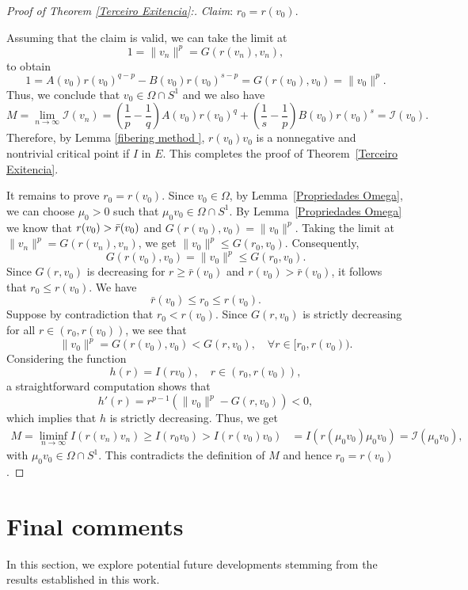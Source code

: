 \documentclass[12pt,reqno]{amsart}
\begin{document}
\begin{proof}[Proof of Theorem \ref{Terceiro Exitencia}:]
\noindent\textit{Claim}: $r_0=r(v_0)$.

Assuming that the claim is valid, we can take the limit at 
$$ 
 1=\|v_n\|^p=G(r(v_n),v_n),
 $$
 to obtain
\begin{equation*}
1=A(v_0)r(v_0)^{q-p}-B(v_0)r(v_0)^{s-p}=G(r(v_0),v_0)=\|v_0\|^p.
\end{equation*}
Thus, we conclude that $v_0\in \Omega\cap S^1$ and we also have 
$$
M=\lim_{n\rightarrow\infty} \mathcal{I}(v_n)=\left(\frac{1}{p}-\frac{1}{q}\right)A(v_0)r(v_0)^q+\left(\frac{1}{s}-\frac{1}{p}\right)B(v_0)r(v_0)^s=\mathcal{I}(v_0).
$$
Therefore, by Lemma \ref{fibering method }, $r(v_0)v_0$ is a nonnegative and nontrivial critical point if $I$ in $E$. This completes the proof of Theorem~\ref{Terceiro Exitencia}.

It remains to prove $r_0=r(v_0)$. Since $v_0 \in \Omega$, by Lemma~\ref{Propriedades Omega}, we can choose $\mu_0>0$ such that $\mu_0 v_0 \in \Omega\cap S^1$. By Lemma~\ref{Propriedades Omega} we know that $r( v_0)>\Bar{r}( v_0)$ and $G(r(v_0),v_0)=\|v_0\|^p$. Taking the limit at $\|v_n\|^p=G(r(v_n),v_n)$, we get 
$
\|v_0\|^p\leq G(r_0,v_0)$. Consequently,
$$
G(r(v_0),v_0)=\|v_0\|^p\leq G(r_0,v_0).
$$
Since $G(r,v_0)$ is decreasing for $r\geq \bar{r}(v_0)$ and $r(v_0)>\bar{r}(v_0)$, it follows that $r_0\leq r(v_0)$. We have 
$$
\bar{r}(v_0)\leq r_0\leq r(v_0).
$$
Suppose by contradiction that $r_0<r(v_0)$. Since $G(r,v_0)$ is strictly decreasing for all $r\in (r_0, r(v_0))$, we see that 
\begin{equation*}
		\|v_0\|^p=G(r(v_0),v_0)< G(r,v_0), \quad \forall r\in[r_0,r(v_0)).
	\end{equation*} 
Considering the function
$$
h(r)= I(rv_0), \quad r \in (r_0, r(v_0)),
$$
 a straightforward computation shows that 
 $$
 h'(r)=r^{p-1}\left(\|v_0\|^p-G(r,v_0)\right)<0,
 $$
 which implies that $h$ is strictly decreasing. Thus, we get 
	\begin{align*}
		M=\liminf_{n \rightarrow \infty}I(r(v_n)v_n)
		\geq I(r_0v_0)
		> I(r(v_0)v_0)
		&=I(r(\mu_0 v_0)\mu_0 v_0)= \mathcal{I}(\mu_0 v_0),
	\end{align*}
with $\mu_0 v_0\in \Omega\cap S^1$. This contradicts the definition of $M$ and hence $r_0=r(v_0)$. 
\end{proof}



\section{Final comments}
In this section, we explore potential future developments stemming from the results established in this work.
\end{document}

